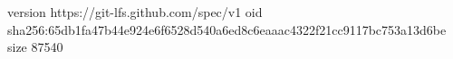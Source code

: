 version https://git-lfs.github.com/spec/v1
oid sha256:65db1fa47b44e924e6f6528d540a6ed8c6eaaac4322f21cc9117bc753a13d6be
size 87540
